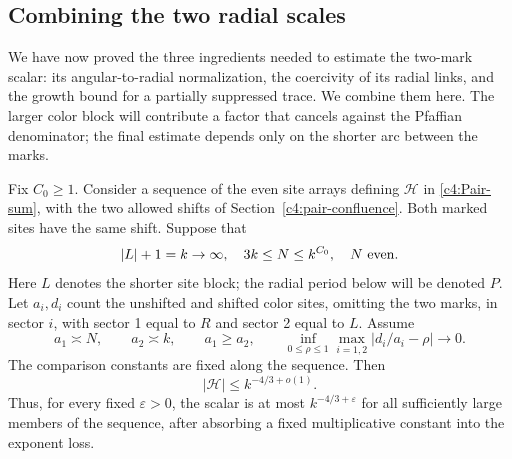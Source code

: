 \subsection{Combining the two radial scales}\label{c4:hierarchical}

We have now proved the three ingredients needed to estimate the two-mark
scalar: its angular-to-radial normalization, the coercivity of its radial
links, and the growth bound for a partially suppressed trace.  We combine
them here.  The larger color block will contribute a factor that cancels
against the Pfaffian denominator; the final estimate depends only on the
shorter arc between the marks.

\begin{theorem}\label{c4:thm-two-mark}
Fix \(C_0\ge1\).  Consider a sequence of the even site arrays defining
\(\mathscr H\) in \eqref{c4:Pair-sum}, with the two allowed shifts of
Section~\ref{c4:pair-confluence}.  Both marked sites have the same shift.
Suppose that
\[
 |L|+1=k\to\infty,\quad 3k\le N\le k^{C_0},\quad N\ {\rm even}.
\]
Here \(L\) denotes the shorter site block; the radial period below will
be denoted \(P\).  Let \(a_i,d_i\) count the unshifted and shifted color
sites, omitting the two marks, in sector \(i\), with sector 1 equal to
\(R\) and sector 2 equal to \(L\).  Assume
\[
 a_1\asymp N,\qquad a_2\asymp k,\qquad a_1\ge a_2,\qquad
 \inf_{0\le\rho\le1}\max_{i=1,2}|d_i/a_i-\rho|\longrightarrow0.
\]
The comparison constants are fixed along the sequence.  Then
\begin{equation}
                         |\mathscr H|\le k^{-4/3+o(1)}.                   \label{c4:H-bound}
\end{equation}
Thus, for every fixed \(\varepsilon>0\), the scalar is at most
\(k^{-4/3+\varepsilon}\) for all sufficiently large members of the
sequence, after absorbing a fixed multiplicative constant into the
exponent loss.
\end{theorem}

